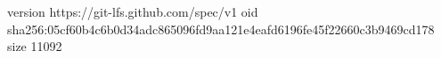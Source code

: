 version https://git-lfs.github.com/spec/v1
oid sha256:05cf60b4c6b0d34adc865096fd9aa121e4eafd6196fe45f22660c3b9469cd178
size 11092
